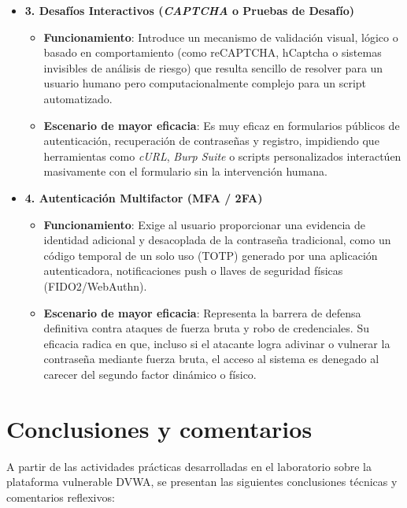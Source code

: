 \documentclass[letter,12pt]{article}
\begin{document}
\begin{itemize}
    \item \textbf{3. Desafíos Interactivos (\textit{CAPTCHA} o Pruebas de Desafío)}
    \begin{itemize}
        \item \textbf{Funcionamiento}: Introduce un mecanismo de validación visual, lógico o basado en comportamiento (como reCAPTCHA, hCaptcha o sistemas invisibles de análisis de riesgo) que resulta sencillo de resolver para un usuario humano pero computacionalmente complejo para un script automatizado.
        \item \textbf{Escenario de mayor eficacia}: Es muy eficaz en formularios públicos de autenticación, recuperación de contraseñas y registro, impidiendo que herramientas como \textit{cURL}, \textit{Burp Suite} o scripts personalizados interactúen masivamente con el formulario sin la intervención humana.
    \end{itemize}

    \item \textbf{4. Autenticación Multifactor (MFA / 2FA)}
    \begin{itemize}
        \item \textbf{Funcionamiento}: Exige al usuario proporcionar una evidencia de identidad adicional y desacoplada de la contraseña tradicional, como un código temporal de un solo uso (TOTP) generado por una aplicación autenticadora, notificaciones push o llaves de seguridad físicas (FIDO2/WebAuthn).
        \item \textbf{Escenario de mayor eficacia}: Representa la barrera de defensa definitiva contra ataques de fuerza bruta y robo de credenciales. Su eficacia radica en que, incluso si el atacante logra adivinar o vulnerar la contraseña mediante fuerza bruta, el acceso al sistema es denegado al carecer del segundo factor dinámico o físico.
    \end{itemize}
\end{itemize}


\section*{Conclusiones y comentarios}

A partir de las actividades prácticas desarrolladas en el laboratorio sobre la plataforma vulnerable DVWA, se presentan las siguientes conclusiones técnicas y comentarios reflexivos:
\end{document}

